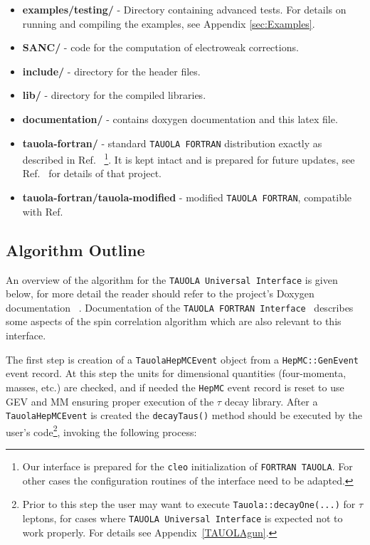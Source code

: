 \documentclass[]{Tauola_interface_design}
\begin{document}
\begin{itemize}
\begin{itemize}
    \end{itemize}   
  \item {\bf examples/testing/} - Directory containing advanced tests. For details on running and compiling the examples, see Appendix \ref{sec:Examples}.

  \item {\bf SANC/} - code for the computation of  electroweak corrections.
  \item {\bf include/} - directory for the header files.
  \item {\bf lib/ } - directory for the compiled  libraries. 
  \item {\bf documentation/ } - contains doxygen documentation and this latex file.
  \item {\bf tauola-fortran/ } - standard  {\tt TAUOLA FORTRAN} distribution 
exactly as described in Ref.~\cite{Golonka:2003xt}%
\footnote{ Our interface is prepared for the {\tt cleo} initialization of  
{\tt FORTRAN TAUOLA}. For other cases
the configuration routines of the interface need to be adapted.}.
It is kept intact and is prepared for future updates, see
Ref.~\cite{Actis:2010gg} for details of that project.
\item {\bf tauola-fortran/tauola-modified } - modified {\tt TAUOLA FORTRAN},
compatible with  Ref.~\cite{Nugent:2013hxa,Fujikawa:2008ma}
\end{itemize}

\subsection{Algorithm Outline}
\label{sect:Outline}

An overview of the algorithm for  the {\tt TAUOLA Universal Interface} is
given below,  for more detail the reader
should refer to the project's Doxygen documentation ~\cite{tauolaC++}.
Documentation of the  {\tt TAUOLA FORTRAN Interface}~\cite{Golonka:2003xt} 
describes some aspects of the spin
correlation algorithm which are also relevant to this interface.


The first step is creation of a {\tt TauolaHepMCEvent} object from
a {\tt HepMC::GenEvent} event record. At this step the units for dimensional
quantities (four-momenta, masses, etc.) are checked, and if needed the {\tt HepMC} event record is
reset to use GEV and MM ensuring proper execution of the $\tau$ decay library.
 After a {\tt TauolaHepMCEvent} is created the
{\tt decayTaus()} method should be executed by the user's code\footnote{Prior to this step
the user may want to execute {\tt Tauola::decayOne(...)} for $\tau$ leptons, for cases where {\tt TAUOLA Universal Interface} is 
expected not to work properly. For details see Appendix~\ref{TAUOLAgun}.
},
invoking the following process:
\end{document}
